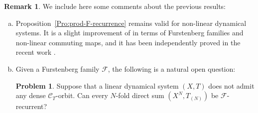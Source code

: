 \documentclass[openright,11pt]{article}
\theoremstyle{plain}
\theoremstyle{definition}
\newtheorem{remark}[theorem]{Remark}
\newtheorem{problem}[theorem]{Problem}
\newcommand{\Fc}{\mathcal{F}}
\newcommand{\Com}{\mathcal{C}}
\begin{document}
\begin{remark}
	We include here some comments about the previous results:
	\begin{enumerate}[(a)]
		\item Proposition~\ref{Pro:prod-F-recurrence} remains valid for non-linear dynamical systems. It is a slight improvement of \cite[Theorem 9.1]{CoMaPa2014} in terms of Furstenberg families and non-linear commuting maps, and it has been independently proved in the recent work \cite[Proposition~3.8]{CarMur2022_arXiv}.
		
		\item Given a Furstenberg family $\Fc$, the following is a natural open question:
		\begin{problem}
			Suppose that a linear dynamical system $(X,T)$ does not admit any dense $\Com_T$-orbit. Can every $N$-fold direct sum $(X^N,T_{(N)})$ be $\Fc$-recurrent?
		\end{problem}
		

\end{enumerate}
\end{remark}
\end{document}

